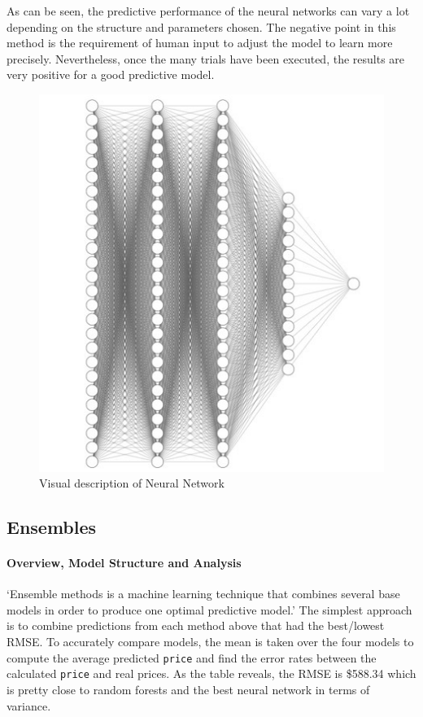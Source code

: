 \documentclass[
  paper=a4,
  ,captions=tableheading
]{scrartcl}
\begin{document}
As can be seen, the predictive performance of the neural networks can
vary a lot depending on the structure and parameters chosen. The
negative point in this method is the requirement of human input to
adjust the model to learn more precisely. Nevertheless, once the many
trials have been executed, the results are very positive for a good
predictive model.

\begin{figure}
\centering
\includegraphics{NN_res.jpeg}
\caption{Visual description of Neural Network}
\end{figure}

\hypertarget{ensembles}{%
\subsection{Ensembles}\label{ensembles}}

\hypertarget{overview-model-structure-and-analysis}{%
\paragraph{Overview, Model Structure and
Analysis}\label{overview-model-structure-and-analysis}}

`Ensemble methods is a machine learning technique that combines several
base models in order to produce one optimal predictive model.' The
simplest approach is to combine predictions from each method above that
had the best/lowest RMSE. To accurately compare models, the mean is
taken over the four models to compute the average predicted
\texttt{price} and find the error rates between the calculated
\texttt{price} and real prices. As the table reveals, the RMSE is
\$588.34 which is pretty close to random forests and the best neural
network in terms of variance.
\end{document}
